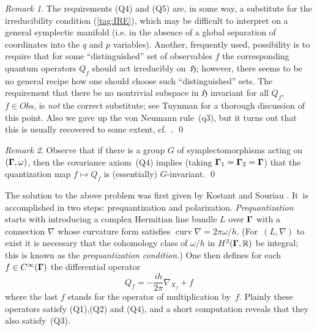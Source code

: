 \documentclass[12pt]{amsart}
\numberwithin{equation}{section}
\theoremstyle{remark}
\newtheorem{remark*}{Remark}
\newcommand\Obs{Obs}
\newcommand\Omg{{\bigam}}   %
\newcommand\HH{\mathfrak H}
\newcommand\RR{\mathbb R}
\newcommand{\bigam}{\mbox{\boldmath $\Gamma$}}
\begin{document}
\begin{remark*} The requirements (Q4) and (Q5) are, in some way, a substitute
for the irreducibility condition (\ref{tag:IRE}), which may be difficult to
interpret on a general symplectic manifold (i.e. in the absence of a global
separation of coordinates into the $q$ and $p$ variables). Another, frequently
used, possibility is to require that for some ``distinguished'' set of
observables $f$ the corresponding quantum operators $Q_f$ should act
irreducibly on~$\HH$; however, there seems to be no general recipe how one
should choose such ``distinguished'' sets. The requirement that there be no
nontrivial subspace in $\HH$ invariant for all $Q_f$, $f\in\Obs$, is
{\it not} the correct substitute; see Tuynman \cite{bib:TuyIrr} for a
thorough discussion of this point. Also we gave up the von Neumann rule~(q3),
but it turns out that this is usually recovered to some extent,
cf.~\cite{bib:GGTuy}.   \qed  \end{remark*}

\begin{remark*} Observe that if there is a group $G$ of symplectomorphisms
acting on $(\Omg,\omega)$, then the covariance axiom~(Q4) implies (taking
$\Omg_1=\Omg_2=\Omg$) that the quantization map $f\mapsto Q_f$ is (essentially)
$G$-invariant.  \qed  \end{remark*}

\medskip

The solution to the above problem was first given by Kostant \cite{bib:Kost}
and Souriau \cite{bib:SouSD}. It~is accomplished in two steps: prequantization
and polarization. {\it Prequantization\/} starts with introducing a complex
Hermitian line bundle $L$ over $\Omg$ with a connection $\nabla$ whose
curvature form satisfies $\operatorname{curv} \nabla=2\pi\omega/h$.
(For~$(L,\nabla)$ to exist it is necessary that the cohomology class of
$\omega/h$ in $H^2(\Omg,\RR)$ be integral; this is known as the
{\it prequantization condition.\/}) One then defines for each
$f\in C^\infty(\Omg)$ the differential operator
\begin{equation}  Q_f = -\frac{ih}{2\pi} \nabla_{X_f} + f  \label{tag:GQF}
\end{equation}
where the last $f$ stands for the operator of multiplication by~$f$. Plainly
these operators satisfy (Q1),(Q2) and (Q4), and a short computation reveals
that they also satisfy~(Q3).
\end{document}
